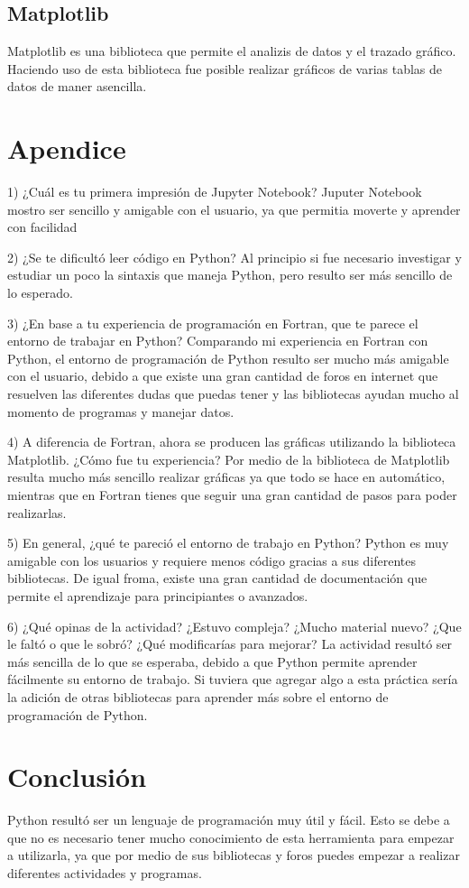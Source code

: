 \documentclass[a4paper]{article}
\begin{document}
\subsection{Matplotlib}
Matplotlib es una biblioteca que permite el analizis de datos y el trazado gráfico. Haciendo uso de esta biblioteca fue posible realizar gráficos de varias tablas de datos de maner asencilla.

\section{Apendice}
1) ¿Cuál es tu primera impresión de Jupyter Notebook?
Juputer Notebook mostro ser sencillo y amigable con el usuario, ya que permitia moverte y aprender con facilidad


2) ¿Se te dificultó leer código en Python?
Al principio si fue necesario investigar y estudiar un poco la sintaxis que maneja Python, pero resulto ser más sencillo de lo esperado.



3) ¿En base a tu experiencia de programación en Fortran, que te parece el entorno de trabajar en Python?
Comparando mi experiencia en Fortran con Python, el entorno de programación de Python resulto ser mucho más amigable con el usuario, debido a que existe una gran cantidad de foros en internet que resuelven las diferentes dudas que puedas tener y las bibliotecas ayudan mucho al momento de programas y manejar datos.


4) A diferencia de Fortran, ahora se producen las gráficas utilizando la biblioteca Matplotlib. ¿Cómo fue tu experiencia?
Por medio de la biblioteca de Matplotlib resulta mucho más sencillo realizar gráficas ya que todo se hace en automático, mientras que en Fortran tienes que seguir una gran cantidad de pasos para poder realizarlas.




5) En general, ¿qué te pareció el entorno de trabajo en Python?
Python es muy amigable con los usuarios y requiere menos código gracias a sus diferentes bibliotecas. De igual froma, existe una gran cantidad de documentación que permite el aprendizaje para principiantes o avanzados. 



6) ¿Qué opinas de la actividad? ¿Estuvo compleja? ¿Mucho material nuevo? ¿Que le faltó o que le sobró? ¿Qué modificarías para mejorar?
La actividad resultó ser más sencilla de lo que se esperaba, debido a que Python permite aprender fácilmente su entorno de trabajo. Si tuviera que agregar algo a esta práctica sería la adición de otras bibliotecas para aprender más sobre el entorno de programación de Python.



\section{Conclusión}
\label{sec:conclucion}

Python resultó ser un lenguaje de programación muy útil y fácil. Esto se debe a que no es necesario tener mucho conocimiento de esta herramienta para empezar a utilizarla, ya que por medio de sus bibliotecas y foros puedes empezar a realizar diferentes actividades y programas.
\end{document}
